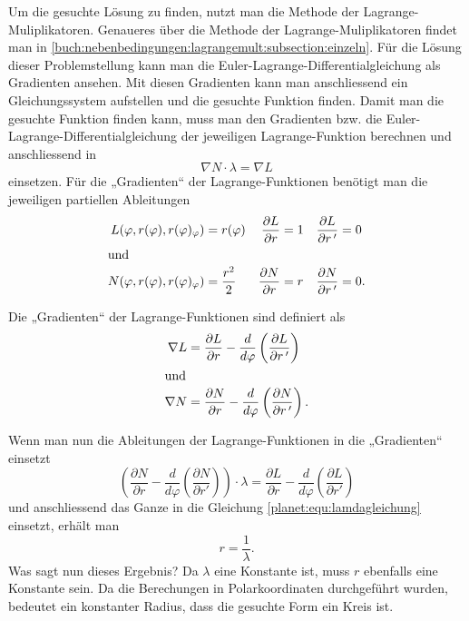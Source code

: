 Um die gesuchte Lösung zu finden, nutzt man die Methode der Lagrange-Muliplika\-to\-ren.
Genaueres über die Methode der Lagrange-Muliplika\-to\-ren findet man in \cref{buch:nebenbedingungen:lagrangemult:subsection:einzeln}.
Für die Lösung dieser Problemstellung kann man die Euler-Lagrange-Dif\-fe\-ren\-ti\-al\-glei\-chung als Gradienten ansehen.
Mit diesen Gradienten kann man anschliessend ein Gleichungssystem aufstellen und die gesuchte Funktion finden.
Damit man die gesuchte Funktion finden kann, muss man den Gradienten bzw. die Euler-Lagrange-Differentialgleichung der jeweiligen Lagrange-Funktion berechnen und anschliessend in
\begin{equation}
	\nabla N \cdot \lambda = \nabla L
	\label{planet:equ:lamdagleichung}
\end{equation}
einsetzen.
Für die „Gradienten“ der Lagrange-Funktionen benötigt man die jeweiligen partiellen Ableitungen
\begin{align*}
	L(\varphi ,r(\varphi),r(\varphi)_\varphi) &= r(\varphi)& \frac{\partial L}{\partial r} &= 1& \frac{\partial L}{\partial r\,'} &= 0 \\
\intertext{und}
	N(\varphi ,r(\varphi),r(\varphi)_\varphi) &= \frac{r^2}{2}& \frac{\partial N}{\partial r} &= r& \frac{\partial N}{\partial r\,'} &= 0.
\end{align*}

\noindent
Die „Gradienten“ der Lagrange-Funktionen sind definiert als 
\begin{align*}
	\nabla L &= \frac{\partial L}{\partial r} - \frac{d}{d\varphi}\left(\frac{\partial L}{\partial r\,'} \right)\\
\intertext{und}
	\nabla N &= \frac{\partial N}{\partial r} - \frac{d}{d\varphi}\left(\frac{\partial N}{\partial r\,'} \right).
\end{align*}

\noindent
Wenn man nun die Ableitungen der Lagrange-Funktionen in die „Gradienten“ einsetzt
\begin{equation*}
	\left(\frac{\partial N}{\partial r} - \frac{d}{d\varphi}\left(\frac{\partial N}{\partial r'}\right)\right)\cdot \lambda = \frac{\partial L}{\partial r}-  \frac{d}{d\varphi}\left( \frac{\partial L}{\partial r'} \right)
\end{equation*} 
und anschliessend das Ganze in die Gleichung \eqref{planet:equ:lamdagleichung} einsetzt, erhält man
\begin{equation*}
	r = \frac{1}{\lambda}.
\end{equation*}
Was sagt nun dieses Ergebnis?
Da \(\lambda\) eine Konstante ist, muss \(r\) ebenfalls eine Konstante sein.
Da die Berechungen in Polarkoordinaten durchgeführt wurden, bedeutet ein konstanter Radius, dass die gesuchte Form ein Kreis ist.

